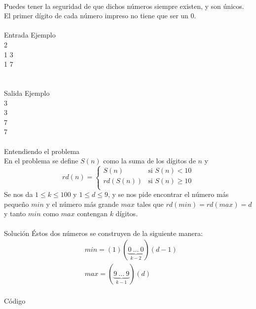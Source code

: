 \documentclass[12pt]{article}
\begin{document}
\\Puedes tener la seguridad de que dichos números siempre existen, y son únicos.
El primer dígito de cada número impreso no tiene que ser un $0$.
\\
\\
\textrm{\large Entrada Ejemplo}
\\
2\\
1 3\\
1 7\\
\\
\\
\textrm{\large Salida Ejemplo}
\\
3\\
3\\
7\\
7\\
\\
\textrm{\large Entendiendo el problema}\\
En el problema se define $S(n)$ como la suma de los dígitos de $n$ y
\[
rd(n) =
\left\{
	\begin{array}{ll}
		S(n)     & \mbox{si } S(n) < 10 \\
		rd(S(n)) & \mbox{si } S(n) \geq 10   \\
	\end{array}
\right.
\]
Se nos da $1 \leq k \leq 100$ y $1 \leq d \leq 9$, y se nos pide encontrar el número más pequeño $min$ y el número más grande $max$ tales que $rd(min) = rd(max) = d$ y tanto $min$ como $max$ contengan $k$ dígitos.\\ 
\\
\textrm{\large Solución}
Éstos dos números se construyen de la siguiente manera:
\begin{align*}
& min = (1)(\underbrace{0\ ...\ 0 }_{k-2})(d-1) \\
& max = (\underbrace{9\ ...\ 9}_{k-1})(d)
\end{align*}
\\
\textrm{\large Código}\\
\end{document}
